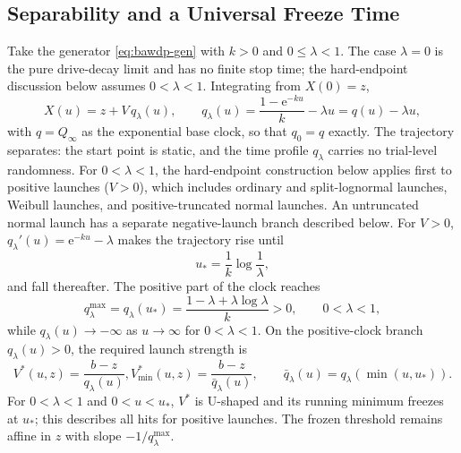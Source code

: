 \documentclass[12pt]{article}
\newcommand{\e}{\mathrm{e}}
\theoremstyle{remark}
\begin{document}
\subsection{Separability and a Universal Freeze Time}
Take the generator \eqref{eq:bawdp-gen} with $k > 0$ and $0 \le \lambda < 1$. The case $\lambda=0$ is the pure drive-decay limit and has no finite stop time; the hard-endpoint discussion below assumes $0<\lambda<1$. Integrating from $X(0)=z$,
\begin{equation}
  X(u) = z + V\,q_{\lambda}(u),
  \qquad
  q_{\lambda}(u) = \frac{1 - \e^{-ku}}{k} - \lambda u = q(u) - \lambda u,
  \label{eq:bawdp-traj}
\end{equation}
with $q=Q_\infty$ as the exponential base clock, so that $q_0=q$ exactly. The trajectory separates: the start point is static, and the time profile $q_{\lambda}$ carries no trial-level randomness. For $0<\lambda<1$, the hard-endpoint construction below applies first to positive launches ($V>0$), which includes ordinary and split-lognormal launches, Weibull launches, and positive-truncated normal launches. An untruncated normal launch has a separate negative-launch branch described below. For $V>0$, $q_{\lambda}'(u)=\e^{-ku}-\lambda$ makes the trajectory rise until
\begin{equation}
  u_{*} = \frac{1}{k}\log\frac{1}{\lambda},
  \label{eq:bawdp-ustar}
\end{equation}
and fall thereafter. The positive part of the clock reaches
\begin{equation}
  q_{\lambda}^{\max}=q_{\lambda}(u_{*})
  =\frac{1-\lambda+\lambda\log\lambda}{k}>0,
  \qquad 0<\lambda<1,
  \label{eq:bawdp-mmax}
\end{equation}
while $q_{\lambda}(u)\to-\infty$ as $u\to\infty$ for $0<\lambda<1$. On the positive-clock branch $q_{\lambda}(u)>0$, the required launch strength is
\begin{equation}
  V^{*}(u,z) = \frac{b-z}{q_{\lambda}(u)},
  V^{*}_{\min}(u,z) = \frac{b-z}{\bar q_{\lambda}(u)},
  \qquad
  \bar q_{\lambda}(u) = q_{\lambda}\!\left(\min(u, u_{*})\right).
  \label{eq:bawdp-vstar}
\end{equation}
For $0<\lambda<1$ and $0<u<u_{*}$, $V^*$ is U-shaped and its running minimum freezes at $u_{*}$; this describes all hits for positive launches. The frozen threshold remains affine in $z$ with slope $-1/q_{\lambda}^{\max}$.
\end{document}
